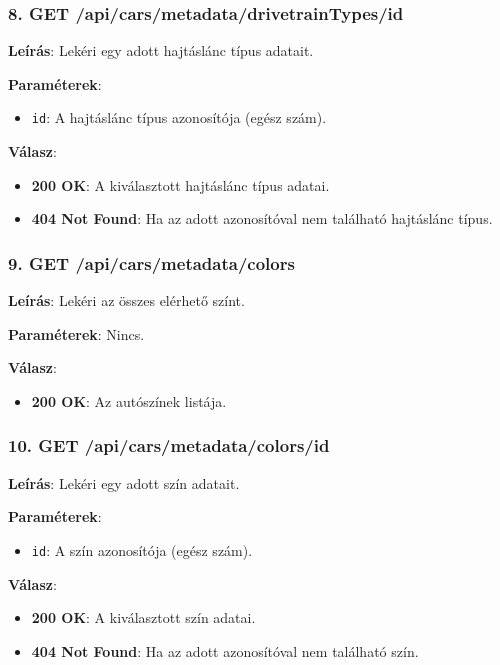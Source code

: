 \documentclass{report}[11pt]
\begin{document}
\subsubsection{8. GET /api/cars/metadata/drivetrainTypes/{id}}

\textbf{Leírás}:  
Lekéri egy adott hajtáslánc típus adatait.

\textbf{Paraméterek}:  
\begin{itemize}
    \item \texttt{id}: A hajtáslánc típus azonosítója (egész szám).
\end{itemize}

\textbf{Válasz}:  
\begin{itemize}
    \item \textbf{200 OK}: A kiválasztott hajtáslánc típus adatai.
    \item \textbf{404 Not Found}: Ha az adott azonosítóval nem található hajtáslánc típus.
\end{itemize}

\subsubsection{9. GET /api/cars/metadata/colors}

\textbf{Leírás}:  
Lekéri az összes elérhető színt.

\textbf{Paraméterek}:  
Nincs.

\textbf{Válasz}:  
\begin{itemize}
    \item \textbf{200 OK}: Az autószínek listája.
\end{itemize}

\subsubsection{10. GET /api/cars/metadata/colors/{id}}

\textbf{Leírás}:  
Lekéri egy adott szín adatait.

\textbf{Paraméterek}:  
\begin{itemize}
    \item \texttt{id}: A szín azonosítója (egész szám).
\end{itemize}

\textbf{Válasz}:  
\begin{itemize}
    \item \textbf{200 OK}: A kiválasztott szín adatai.
    \item \textbf{404 Not Found}: Ha az adott azonosítóval nem található szín.
\end{itemize}
\end{document}
